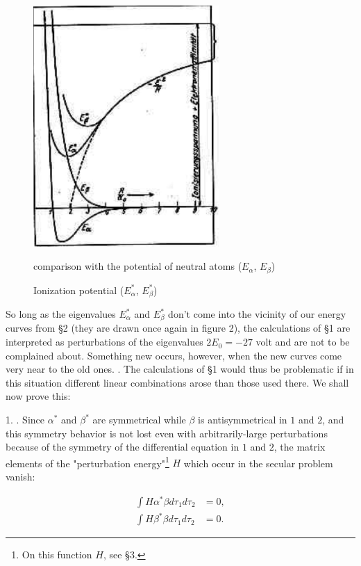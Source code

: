 \documentclass{article}
\newcommand{\uequ}[1]{
\begin{align*}
#1
\end{align*}
}
\begin{document}
\begin{figure}[h!]
\centering
\includegraphics[width=200pt]{images/figure2}
{\caption{Ionization potential ($E_\alpha^*$, $E_\beta^*$)} comparison with the potential of neutral atoms ($E_\alpha$, $E_\beta$)}
\end{figure}

So long as the eigenvalues $E_\alpha^*$ and $E_\beta^*$ don't come into the vicinity of our energy curves from §2 (they are drawn once again in figure 2), the calculations of §1 are interpreted as perturbations of the eigenvalues $2E_0 = -27$ volt and are not to be complained about. Something new occurs, however, when the new curves come very near to the old ones. . The calculations of §1 would thus be problematic if in this situation different linear combinations arose than those used there. We shall now prove this:

1. . Since $\alpha^*$ and $\beta^*$ are symmetrical while $\beta$ is antisymmetrical in $1$ and $2$, and this symmetry behavior is not lost even with arbitrarily-large perturbations because of the symmetry of the differential equation in $1$ and $2$, the matrix elements of the "perturbation energy"\footnote{On this function $H$, see §3.} $H$ which occur in the secular problem vanish:
\uequ{
\int H\alpha^* \beta d\tau_1 d\tau_2 &= 0,\\
\int H\beta^* \beta d\tau_1 d\tau_2  &= 0.
}
\end{document}
